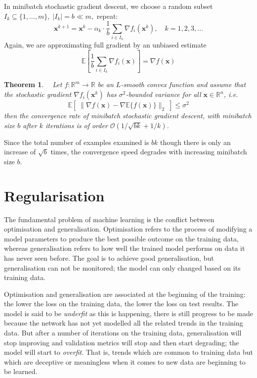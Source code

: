 \documentclass[12pt]{report}
\newtheorem{thm}{Theorem}[section]
\numberwithin{equation}{section}
\begin{document}
In minibatch stochastic gradient descent,  we choose a random subset $I_{k} \subseteq\{1, \ldots, m\},\;\left|I_{k}\right|=b \ll m,$ repeat:
\begin{equation}\label{eqn:mini_sgd}
\bm{x}^{k+1}=\bm{x}^{k}- \alpha_k \cdot \frac{1}{b} \sum_{i \in I_{k}} \nabla f_{i}\left(\bm{x}^{k}\right), \quad k=1,2,3, \ldots
\end{equation}
Again, we are approximating full gradient by an unbiased estimate
\[
\mathbb{E}\left[\frac{1}{b} \sum_{i \in I_{k}} \nabla f_{i}(\bm{x})\right]=\nabla f(\bm{x})
\]
\begin{thm}
\normalfont \textbf{~\cite{dekel2012optimal}} 
Let $f:\mathbb{R}^m\rightarrow\mathbb{R}$ be an $L$-smooth convex function and assume that the stochastic gradient $\nabla f_i(\bm{x}^k)$ has $\sigma^2$-bounded variance for all $\bm{x} \in \mathbb{R}^n$, i.e.
\[
\mathbb{E}\left[\;\|\nabla f(\bm{x}) - \nabla\mathbb{E}\{f(\bm{x})\} \|_2\;\right] \leq \sigma^2
\]
then the convergence rate of minibatch stochastic gradient descent, with minibatch size $b$ after $k$ iterations is of order $\mathcal{O}(1/\sqrt{bk}+1/k)$.
\end{thm}
\noindent
Since the total number of examples examined is $bk$ though there is only an increase of $\sqrt{b}$ times, the convergence speed degrades with increasing minibatch size $b$.

\section{Regularisation}\label{sec:regularisation}
The fundamental problem of machine learning is the conflict between optimisation and generalisation. Optimisation refers to the process of modifying a model parameters to produce the best possible outcome on the training data, whereas generalisation refers to how well the trained model performs on data it has never seen before. The goal is to achieve good generalisation, but generalisation can not be monitored; the model can only changed based on its training data. 

Optimisation and generalisation are associated at the beginning of the training: the lower the loss on the training data, the lower the loss on test results. The model is said to be \textit{underfit} as this is happening, there is still progress to be made because the network has not yet modelled all the related trends in the training data. But after a number of iterations on the training data, generalisation will stop improving and validation metrics will stop and then start degrading; the model will start to \textit{overfit}. That is, trends which are common to training data but which are deceptive or meaningless when it comes to new data are beginning to be learned.
\end{document}
